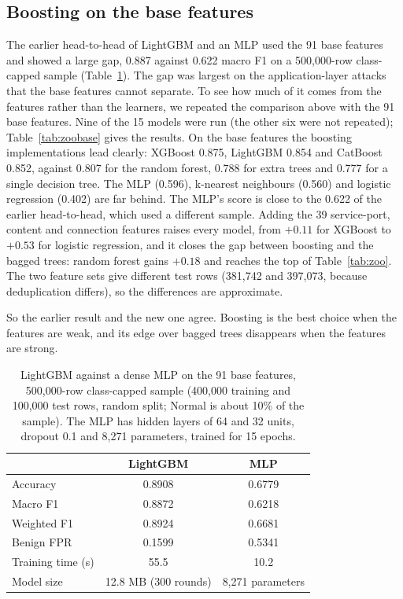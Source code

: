 \subsection{Boosting on the base features}
\label{sec:basezoo}
The earlier head-to-head of LightGBM and an MLP used the 91 base features and showed a large gap, 0.887 against 0.622 macro F1 on a 500,000-row class-capped sample (Table~\ref{tab:mlp}). The gap was largest on the application-layer attacks that the base features cannot separate. To see how much of it comes from the features rather than the learners, we repeated the comparison above with the 91 base features. Nine of the 15 models were run (the other six were not repeated); Table~\ref{tab:zoobase} gives the results. On the base features the boosting implementations lead clearly: XGBoost 0.875, LightGBM 0.854 and CatBoost 0.852, against 0.807 for the random forest, 0.788 for extra trees and 0.777 for a single decision tree. The MLP (0.596), k-nearest neighbours (0.560) and logistic regression (0.402) are far behind. The MLP's score is close to the 0.622 of the earlier head-to-head, which used a different sample. Adding the 39 service-port, content and connection features raises every model, from $+0.11$ for XGBoost to $+0.53$ for logistic regression, and it closes the gap between boosting and the bagged trees: random forest gains $+0.18$ and reaches the top of Table~\ref{tab:zoo}. The two feature sets give different test rows (381,742 and 397,073, because deduplication differs), so the differences are approximate.

\begin{table}[t]
\centering
\caption{Nine classifiers on the 91 base features and on the 130 features (connection-grouped split, seed 42; 500,000 training rows). The last column is the macro-F1 gain from the 39 added features.}
\label{tab:zoobase}
\small

\end{table}

So the earlier result and the new one agree. Boosting is the best choice when the features are weak, and its edge over bagged trees disappears when the features are strong.

\begin{table}[t]
\centering
\caption{LightGBM against a dense MLP on the 91 base features, 500,000-row class-capped sample (400,000 training and 100,000 test rows, random split; Normal is about 10\% of the sample). The MLP has hidden layers of 64 and 32 units, dropout 0.1 and 8,271 parameters, trained for 15 epochs.}
\label{tab:mlp}
\small
\begin{tabular}{lcc}
\toprule
 & LightGBM & MLP \\
\midrule
Accuracy & 0.8908 & 0.6779 \\
Macro F1 & 0.8872 & 0.6218 \\
Weighted F1 & 0.8924 & 0.6681 \\
Benign FPR & 0.1599 & 0.5341 \\
Training time (s) & 55.5 & 10.2 \\
Model size & 12.8 MB (300 rounds) & 8,271 parameters \\
\bottomrule
\end{tabular}
\end{table}

